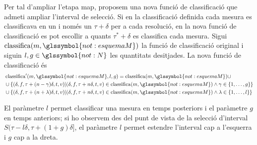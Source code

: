 Per tal d'ampliar l'etapa map, proposem una nova funció de
classificació que admeti ampliar l'interval de selecció. Si en la
classificació definida cada mesura es classificava en un i només un
$\tau+\delta$ per a cada resolució, en la nova funció de classificació
es pot escollir a quants $\tau^*+\delta$ es classifica cada mesura.
Sigui $\operatorname{classifica}(m,\glssymbol{not:esquemaM})$ la
funció de classificació original i siguin $l,g\in\glssymbol{not:N}$ les
quantitats desitjades. La nova funció de classificació és
\begin{align*}
  &\operatorname{classifica}'(m,\glssymbol{not:esquemaM},l,g)= 
  \operatorname{classifica}(m,\glssymbol{not:esquemaM}) \cup \\
  &\cup \{ (\delta,f,\tau+(n-\gamma)\delta,t,v)  
  |(\delta,f,\tau+n\delta,t,v) \in
  \operatorname{classifica}(m,\glssymbol{not:esquemaM}) \wedge \gamma \in
  \{1,\dotsc,g\} \} \\
  &\cup \{ (\delta,f,\tau+(n+\lambda)\delta,t,v)  
  |(\delta,f,\tau+n\delta,t,v) \in
  \operatorname{classifica}(m,\glssymbol{not:esquemaM}) \wedge \lambda \in
  \{1,\dotsc,l\} \}
\end{align*}


El paràmetre $l$ permet classificar una mesura en temps posteriors i
el paràmetre $g$ en temps anteriors; si ho observem des del punt de
vista de la selecció d'interval
$S(\tau-l\delta,\tau+(1+g)\delta]$, el paràmetre $l$
permet estendre l'interval cap a l'esquerra i $g$ cap a la dreta.

